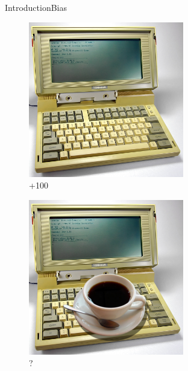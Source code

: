 \begin{frame}{Introduction}{Bias}
\begin{figure}[ht]
\begin{minipage}[b]{0.26\linewidth}
\includegraphics[width=\textwidth]{img/introduction/laptop.png}
\\{\color{green}+100}
\end{minipage}
\hfill
\begin{minipage}[b]{0.26\linewidth}
\centering
\includegraphics[width=\textwidth]{img/introduction/coffee_on_laptop.png}
\\?
\end{minipage}
\end{figure}

\end{frame}

